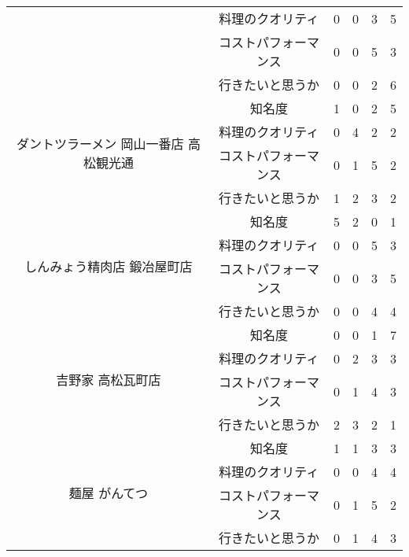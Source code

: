 \begin{table}[H]
{\begin{tabular}{|c|c|r|r|r|r|}
 & 料理のクオリティ & 0 & 0 & 3 & 5 \\ \cline{2-6}
 & コストパフォーマンス & 0 & 0 & 5 & 3 \\ \cline{2-6}
 & 行きたいと思うか & 0 & 0 & 2 & 6 \\ \hline
\multirow{4}{*}{ダントツラーメン 岡山一番店 高松観光通} & 知名度 & 1 & 0 & 2 & 5 \\ \cline{2-6}
 & 料理のクオリティ & 0 & 4 & 2 & 2 \\ \cline{2-6}
 & コストパフォーマンス & 0 & 1 & 5 & 2 \\ \cline{2-6}
 & 行きたいと思うか & 1 & 2 & 3 & 2 \\ \hline
\multirow{4}{*}{しんみょう精肉店 鍛冶屋町店} & 知名度 & 5 & 2 & 0 & 1 \\ \cline{2-6}
 & 料理のクオリティ & 0 & 0 & 5 & 3 \\ \cline{2-6}
 & コストパフォーマンス & 0 & 0 & 3 & 5 \\ \cline{2-6}
 & 行きたいと思うか & 0 & 0 & 4 & 4 \\ \hline
\multirow{4}{*}{吉野家 高松瓦町店} & 知名度 & 0 & 0 & 1 & 7 \\ \cline{2-6}
 & 料理のクオリティ & 0 & 2 & 3 & 3 \\ \cline{2-6}
 & コストパフォーマンス & 0 & 1 & 4 & 3 \\ \cline{2-6}
 & 行きたいと思うか & 2 & 3 & 2 & 1 \\ \hline
\multirow{4}{*}{麺屋 がんてつ} & 知名度 & 1 & 1 & 3 & 3 \\ \cline{2-6}
 & 料理のクオリティ & 0 & 0 & 4 & 4 \\ \cline{2-6}
 & コストパフォーマンス & 0 & 1 & 5 & 2 \\ \cline{2-6}
 & 行きたいと思うか & 0 & 1 & 4 & 3 \\ \hline
\end{tabular}
}
\end{table}
